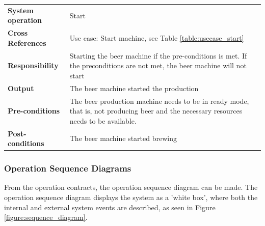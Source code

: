 \begin{table}[H]
    \begin{tabularx}{\textwidth}{|>{\RaggedRight}p{3.7cm}|>{\RaggedRight}X|}
        \hline
        \multicolumn{2}{|c|}{\textbf{Start}}\\
        \hline
        \textbf{System operation} & Start\\
        \hline
        \textbf{Cross References} & Use case: Start machine, see Table \ref{table:usecase_start} \\
        \hline
        \textbf{Responsibility} & Starting the beer machine if the pre-conditions 
        is met. If the preconditions are not met, the beer machine will not
        start \\
        \hline
        \textbf{Output} & The beer machine started the production\\
        \hline
        \textbf{Pre-conditions} & The beer production machine needs to be in
        ready mode, that is, not producing beer and the necessary resources
        needs to be available. \\
        \hline
        \textbf{Post-conditions} & The beer machine started brewing\\
        \hline
    \end{tabularx}
    \label{table:Operation_Contracts_start}
\end{table}

\subsubsection{Operation Sequence Diagrams}
From the operation contracts, the operation sequence diagram can be made. The
operation sequence diagram displays the system as a 'white box', where both the
internal and external system events are described, as seen in Figure
\ref{figure:sequence_diagram}.

